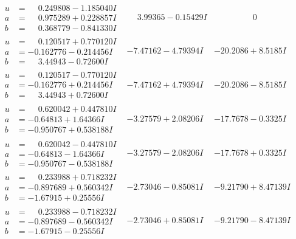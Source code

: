 \documentclass[1p]{elsarticle_modified}
\theoremstyle{definition}
\begin{document}
$$\begin{array}{c|c|c}
\begin{aligned}
u &= \phantom{-}0.249808 - 1.185040 I \\
a &= \phantom{-}0.975289 + 0.228857 I \\
b &= \phantom{-}0.368779 - 0.841330 I\end{aligned}
 & \phantom{-}3.99365 - 0.15429 I & \phantom{-0.000000 } 0 \\ \hline\begin{aligned}
u &= \phantom{-}0.120517 + 0.770120 I \\
a &= -0.162776 - 0.214456 I \\
b &= \phantom{-}3.44943 - 0.72600 I\end{aligned}
 & -7.47162 - 4.79394 I & -20.2086 + 8.5185 I \\ \hline\begin{aligned}
u &= \phantom{-}0.120517 - 0.770120 I \\
a &= -0.162776 + 0.214456 I \\
b &= \phantom{-}3.44943 + 0.72600 I\end{aligned}
 & -7.47162 + 4.79394 I & -20.2086 - 8.5185 I \\ \hline\begin{aligned}
u &= \phantom{-}0.620042 + 0.447810 I \\
a &= -0.64813 + 1.64366 I \\
b &= -0.950767 + 0.538188 I\end{aligned}
 & -3.27579 + 2.08206 I & -17.7678 - 0.3325 I \\ \hline\begin{aligned}
u &= \phantom{-}0.620042 - 0.447810 I \\
a &= -0.64813 - 1.64366 I \\
b &= -0.950767 - 0.538188 I\end{aligned}
 & -3.27579 - 2.08206 I & -17.7678 + 0.3325 I \\ \hline\begin{aligned}
u &= \phantom{-}0.233988 + 0.718232 I \\
a &= -0.897689 + 0.560342 I \\
b &= -1.67915 + 0.25556 I\end{aligned}
 & -2.73046 - 0.85081 I & -9.21790 + 8.47139 I \\ \hline\begin{aligned}
u &= \phantom{-}0.233988 - 0.718232 I \\
a &= -0.897689 - 0.560342 I \\
b &= -1.67915 - 0.25556 I\end{aligned}
 & -2.73046 + 0.85081 I & -9.21790 - 8.47139 I \\ \hline\begin{aligned}

\end{aligned}
\end{array}$$
\end{document}
